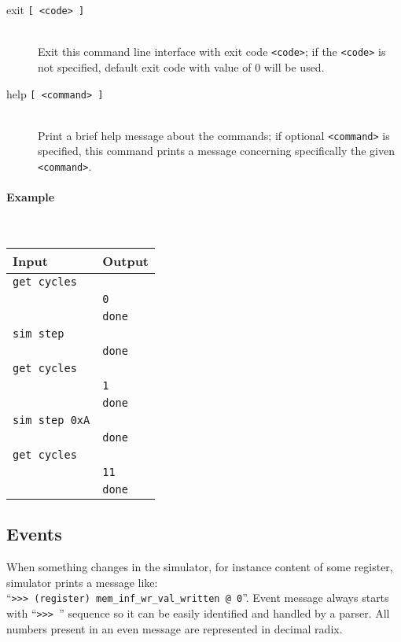 \begin{description}
            \item[exit \texttt{{[} <code> {]}}]~\\
                Exit this command line interface with exit code \texttt{<code>}; if the \texttt{<code>} is not specified, default exit code with value of 0 will be used.

            \item[help \texttt{{[} <command> {]}}]~\\
                Print a brief help message about the commands; if optional \texttt{<command>} is specified, this command prints a message concerning specifically the given \texttt{<command>}.
        \end{description}

        \paragraph{Example}~\\
            \begin{tabular}{l|l}
                \textbf{Input}          & \textbf{Output} \\
                \hline
                \verb'get cycles'       & \\
                                        & \verb'0'\\
                                        & \verb'done'\\
                \hline
                \verb'sim step'         & \\
                                        & \verb'done'\\
                \hline
                \verb'get cycles'       & \\
                                        & \verb'1'\\
                                        & \verb'done'\\
                \hline
                \verb'sim step 0xA'     & \\
                                        & \verb'done'\\
                \hline
                \verb'get cycles'       & \\
                                        & \verb'11'\\
                                        & \verb'done'\\
            \end{tabular}

    \subsection{Events}
        When something changes in the simulator, for instance content of some register, simulator prints a message like: ``\texttt{>{}>{}>~(register)~mem\_inf\_wr\_val\_written~@~0}''. Event message always starts with ``\texttt{>{}>{}> }'' sequence so it can be easily identified and handled by a parser. All numbers present in an even message are represented in decimal radix.


